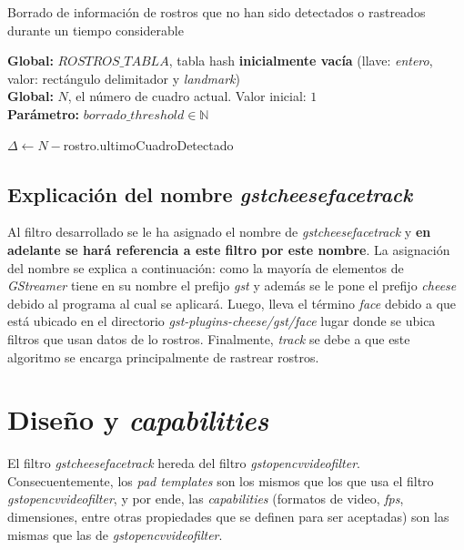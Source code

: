\documentclass[a4paper,openright,12pt]{report}
\begin{document}
\begin{algorithm}
  \caption{Borrado de información de rostros que no han sido detectados o
      rastreados durante un tiempo considerable}
  \label{alg:delete}
  \textbf{Global: }$ROSTROS\_TABLA$, tabla hash \textbf{inicialmente vacía}
      (llave: \textit{entero}, valor: rectángulo delimitador y \textit{landmark})\\
  \textbf{Global: }$N$, el número de cuadro actual. Valor inicial: $1$\\
  \textbf{Parámetro: }$borrado\_threshold \in \mathbb{N}$\\
  \begin{algorithmic}[1]
        \State $\Delta\gets N - $rostro.ultimoCuadroDetectado
          \State {}
        \EndIf
      \EndFor
    \EndProcedure
  \end{algorithmic}
\end{algorithm}

\subsection{Explicación del nombre \textit{gstcheesefacetrack}}
Al filtro desarrollado se le ha asignado el nombre de
\textit{gstcheesefacetrack} y \textbf{en adelante se hará referencia a este
filtro por este nombre}. La asignación del nombre se explica a continuación:
como la mayoría de elementos de \textit{GStreamer} tiene en su nombre el prefijo
\textit{gst} y además se le pone el prefijo \textit{cheese} debido al programa
al cual se aplicará. Luego, lleva el término \textit{face} debido a que está
ubicado en el directorio \textit{gst-plugins-cheese/gst/face} lugar donde se
ubica filtros que usan datos de lo rostros. Finalmente, \textit{track} se debe
a que este algoritmo se encarga principalmente de rastrear rostros.

\section{Diseño y \textit{capabilities}}
El filtro \textit{gstcheesefacetrack} hereda del filtro
\textit{gstopencvvideofilter}. Consecuentemente, los \textit{pad templates} son
los mismos que los que usa el filtro \textit{gstopencvvideofilter}, y por ende,
las \textit{capabilities} (formatos de video, \textit{fps}, dimensiones, entre
otras propiedades que se definen para ser aceptadas) son las mismas que las de
\textit{gstopencvvideofilter}.\\
\end{document}
